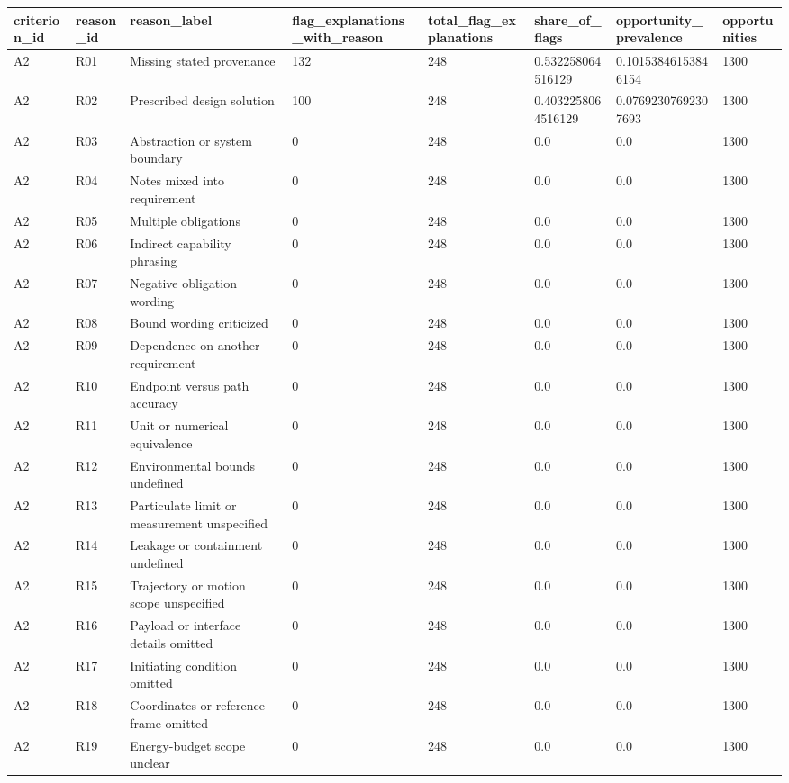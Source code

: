 \begin{tabular}{llllllll}
\hline
criterion\_id & reason\_id & reason\_label & flag\_explanations\_with\_reason & total\_flag\_explanations & share\_of\_flags & opportunity\_prevalence & opportunities \\
\hline
A2 & R01 & Missing stated provenance & 132 & 248 & 0.532258064516129 & 0.10153846153846154 & 1300 \\
A2 & R02 & Prescribed design solution & 100 & 248 & 0.4032258064516129 & 0.07692307692307693 & 1300 \\
A2 & R03 & Abstraction or system boundary & 0 & 248 & 0.0 & 0.0 & 1300 \\
A2 & R04 & Notes mixed into requirement & 0 & 248 & 0.0 & 0.0 & 1300 \\
A2 & R05 & Multiple obligations & 0 & 248 & 0.0 & 0.0 & 1300 \\
A2 & R06 & Indirect capability phrasing & 0 & 248 & 0.0 & 0.0 & 1300 \\
A2 & R07 & Negative obligation wording & 0 & 248 & 0.0 & 0.0 & 1300 \\
A2 & R08 & Bound wording criticized & 0 & 248 & 0.0 & 0.0 & 1300 \\
A2 & R09 & Dependence on another requirement & 0 & 248 & 0.0 & 0.0 & 1300 \\
A2 & R10 & Endpoint versus path accuracy & 0 & 248 & 0.0 & 0.0 & 1300 \\
A2 & R11 & Unit or numerical equivalence & 0 & 248 & 0.0 & 0.0 & 1300 \\
A2 & R12 & Environmental bounds undefined & 0 & 248 & 0.0 & 0.0 & 1300 \\
A2 & R13 & Particulate limit or measurement unspecified & 0 & 248 & 0.0 & 0.0 & 1300 \\
A2 & R14 & Leakage or containment undefined & 0 & 248 & 0.0 & 0.0 & 1300 \\
A2 & R15 & Trajectory or motion scope unspecified & 0 & 248 & 0.0 & 0.0 & 1300 \\
A2 & R16 & Payload or interface details omitted & 0 & 248 & 0.0 & 0.0 & 1300 \\
A2 & R17 & Initiating condition omitted & 0 & 248 & 0.0 & 0.0 & 1300 \\
A2 & R18 & Coordinates or reference frame omitted & 0 & 248 & 0.0 & 0.0 & 1300 \\
A2 & R19 & Energy-budget scope unclear & 0 & 248 & 0.0 & 0.0 & 1300 \\

\end{tabular}
